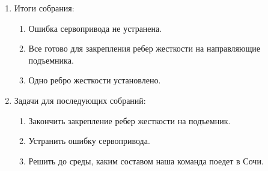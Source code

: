 \begin{enumerate}
\begin{enumerate}
    \end{enumerate}
    
	\item Итоги собрания: 
	\begin{enumerate}
	  \item Ошибка сервопривода не устранена.
	  
      \item Все готово для закрепления ребер жесткости на направляющие подъемника.
      
      \item Одно ребро жесткости установлено.
      
    \end{enumerate}
    
	\item Задачи для последующих собраний:
	\begin{enumerate}
	  \item Закончить закрепление ребер жесткости на подъемник.
	  
	  \item Устранить ошибку сервопривода.
	  
	  \item	Решить до среды, каким составом наша команда поедет в Сочи.
	  
    \end{enumerate}     
\end{enumerate}
\fillpage
